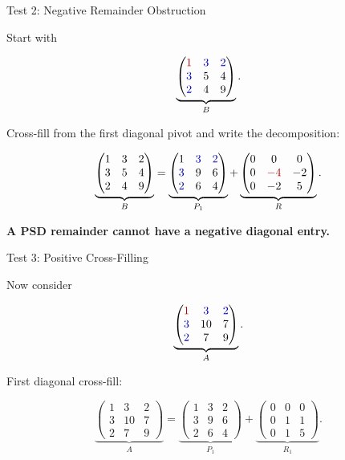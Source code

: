 \documentclass[10pt]{beamer}
\theoremstyle{definition}
\newcommand{\x}[1]{\alert{\textbf{#1}}}
\newcommand{\rd}[1]{{\color{red!70!black}#1}}
\newcommand{\bl}[1]{{\color{blue!70!black}#1}}
\begin{document}
\begin{frame}{Test 2: Negative Remainder Obstruction}

Start with

\[
\underbrace{
\begin{pmatrix}
\rd{1}&\bl{3}&\bl{2}\\
\bl{3}&5&4\\
\bl{2}&4&9
\end{pmatrix}}_{B}.
\]

\vfill

Cross-fill from the first diagonal pivot and write the decomposition:

\[
\underbrace{
\begin{pmatrix}
1&3&2\\
3&5&4\\
2&4&9
\end{pmatrix}}_{B}
=
\underbrace{
\begin{pmatrix}
1&\bl{3}&\bl{2}\\
\bl{3}&9&6\\
\bl{2}&6&4
\end{pmatrix}}_{P_1}
+
\underbrace{
\begin{pmatrix}
0&0&0\\
0&\rd{-4}&-2\\
0&-2&5
\end{pmatrix}}_{R}.
\]

\vfill

\begin{center}
\x{A PSD remainder cannot have a negative diagonal entry.}
\end{center}

\end{frame}


\begin{frame}{Test 3: Positive Cross-Filling}

Now consider

\[
\underbrace{
\begin{pmatrix}
\rd{1}&\bl{3}&\bl{2}\\
\bl{3}&10&7\\
\bl{2}&7&9
\end{pmatrix}}_{A}.
\]

\vfill

First diagonal cross-fill:

\[
\underbrace{
\begin{pmatrix}
1&3&2\\
3&10&7\\
2&7&9
\end{pmatrix}}_{A}
=
\underbrace{
\begin{pmatrix}
1&3&2\\
3&9&6\\
2&6&4
\end{pmatrix}}_{P_1}
+
\underbrace{
\begin{pmatrix}
0&0&0\\
0&1&1\\
0&1&5
\end{pmatrix}}_{R_1}.
\]

\end{frame}
\end{document}
